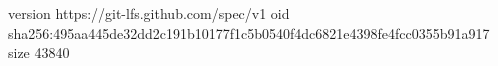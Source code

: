 version https://git-lfs.github.com/spec/v1
oid sha256:495aa445de32dd2c191b10177f1c5b0540f4dc6821e4398fe4fcc0355b91a917
size 43840

